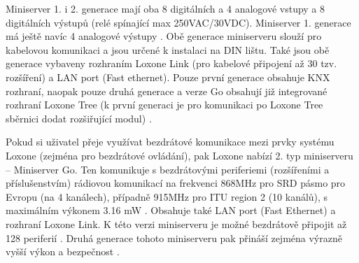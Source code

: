 Miniserver 1. i 2. generace mají oba 8 digitálních a 4 analogové vstupy a 8 digitálních výstupů (relé spínající max 250VAC/30VDC). Miniserver 1. generace má ještě navíc 4 analogové výstupy \cite{MiniserverDokumentace2}. Obě generace miniserveru slouží pro kabelovou komunikaci a jsou určené k instalaci na DIN lištu. Také jsou obě generace vybaveny rozhraním Loxone Link (pro kabelové připojení až 30 tzv. rozšíření) a LAN port (Fast ethernet). Pouze první generace obsahuje KNX rozhraní, naopak pouze druhá generace a verze Go obsahují již integrované rozhraní Loxone Tree (k první generaci je pro komunikaci po Loxone Tree sběrnici dodat rozšiřující modul) \cite{MiniserverDokumentace3}.

Pokud si uživatel přeje využívat bezdrátové komunikace mezi prvky systému Loxone (zejména pro bezdrátové ovládání), pak Loxone nabízí 2. typ miniserveru – Miniserver Go. Ten komunikuje s bezdrátovými periferiemi (rozšířeními a příslušenstvím) rádiovou komunikací na frekvenci 868MHz pro SRD pásmo pro Evropu (na 4 kanálech), případně 915MHz pro ITU region 2 (10 kanálů), s maximálním výkonem 3.16 mW \cite{MiniserverDokumentace}. Obsahuje také LAN port (Fast Ethernet) a rozhraní Loxone Link. K této verzi miniserveru je možné bezdrátově připojit až 128 periferií \cite{LoxonePresentMiniserverGo}. Druhá generace tohoto miniserveru pak přináší zejména výrazně vyšší výkon a bezpečnost \cite{NovyMiniserverGo}.

